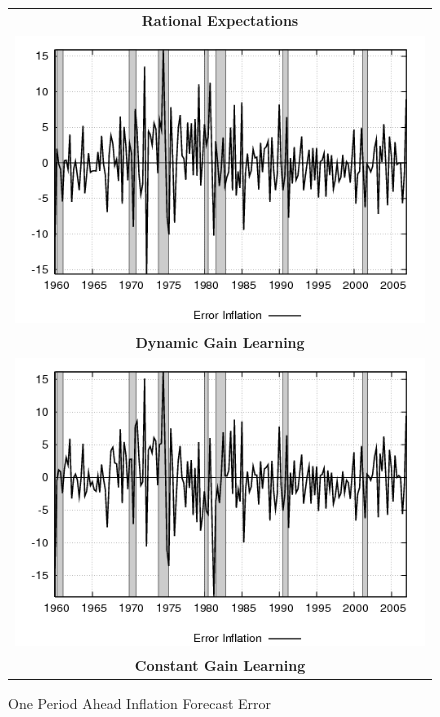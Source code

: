 \begin{figure}[ht]
\caption{One Period Ahead Inflation Forecast Error}\label{fg3:inflationerr}
\begin{center}
\begin{tabular}{c}
\textbf{Rational Expectations} \\  
\includegraphics[scale=0.5]{results_re/inflation_err.png} \\
\textbf{Dynamic Gain Learning} \\
\includegraphics[scale=0.5]{results_dg8_wlsinit/inflation_err.png} \\
\textbf{Constant Gain Learning} \\

\end{tabular}
\end{center}
\end{figure}
